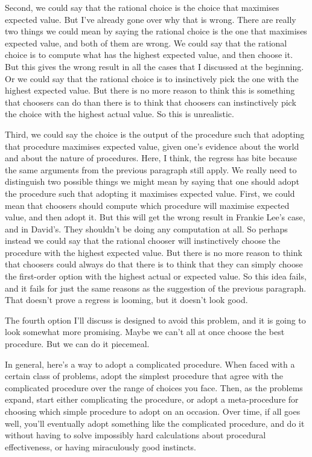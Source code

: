 \documentclass[
  11pt,
  letterpaper,
  DIV=11,
  numbers=noendperiod,
  twoside]{scrartcl}
\begin{document}
Second, we could say that the rational choice is the choice that
maximises expected value. But I've already gone over why that is wrong.
There are really two things we could mean by saying the rational choice
is the one that maximises expected value, and both of them are wrong. We
could say that the rational choice is to compute what has the highest
expected value, and then choose it. But this gives the wrong result in
all the cases that I discussed at the beginning. Or we could say that
the rational choice is to insinctively pick the one with the highest
expected value. But there is no more reason to think this is something
that choosers can do than there is to think that choosers can
instinctively pick the choice with the highest actual value. So this is
unrealistic.

Third, we could say the choice is the output of the procedure such that
adopting that procedure maximises expected value, given one's evidence
about the world and about the nature of procedures. Here, I think, the
regress has bite because the same arguments from the previous paragraph
still apply. We really need to distinguish two possible things we might
mean by saying that one should adopt the procedure such that adopting it
maximises expected value. First, we could mean that choosers should
compute which procedure will maximise expected value, and then adopt it.
But this will get the wrong result in Frankie Lee's case, and in
David's. They shouldn't be doing any computation at all. So perhaps
instead we could say that the rational chooser will instinctively choose
the procedure with the highest expected value. But there is no more
reason to think that choosers could always do that there is to think
that they can simply choose the first-order option with the highest
actual or expected value. So this idea fails, and it fails for just the
same reasons as the suggestion of the previous paragraph. That doesn't
prove a regress is looming, but it doesn't look good.

The fourth option I'll discuss is designed to avoid this problem, and it
is going to look somewhat more promising. Maybe we can't all at once
choose the best procedure. But we can do it piecemeal.

In general, here's a way to adopt a complicated procedure. When faced
with a certain class of problems, adopt the simplest procedure that
agree with the complicated procedure over the range of choices you face.
Then, as the problems expand, start either complicating the procedure,
or adopt a meta-procedure for choosing which simple procedure to adopt
on an occasion. Over time, if all goes well, you'll eventually adopt
something like the complicated procedure, and do it without having to
solve impossibly hard calculations about procedural effectiveness, or
having miraculously good instincts.
\end{document}
